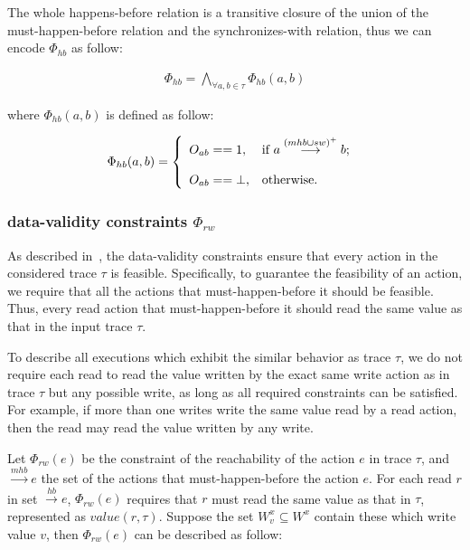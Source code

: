 \documentclass[preprint, numbers, 10pt]{sigplanconf}
\begin{document}
The whole happens-before relation is a transitive closure of the union of the must-happen-before relation
and the synchronizes-with relation, thus we can encode $\Phi_{hb}$ as follow: 

\begin{equation}
\begin{aligned}
\Phi_{hb} = \bigwedge_{\forall a,b\in \tau} \Phi_{hb}(a,b)
\end{aligned}
\end{equation}

where $\Phi_{hb}(a,b)$ is defined as follow: 

\[ \Phi_{hb}(a,b) = \left\{
  \begin{array}{l l}
    O_{ab}==1,           &  {\text{if $a \stackrel{(mhb\cup sw)^+}{\longrightarrow} b$; }}\\\\
    O_{ab}==\bot,  &  \text{otherwise}.
  \end{array} \right.\]

\subsubsection{data-validity constraints $\Phi_{rw}$}

As described in~\cite{Huang:2015}, the data-validity constraints
ensure that every action in the considered trace $\tau$ is feasible. 
Specifically, to guarantee the feasibility of an action, we require that
all the actions that must-happen-before it should be feasible. Thus,
every read action that must-happen-before it should read the same value
as that in the input trace $\tau$.  

To describe all executions which exhibit the similar behavior as trace $\tau$, 
we do not require each read to read the value written by the exact same write action
as in trace $\tau$ but any possible write, as long as all required constraints
can be satisfied. For example, if more than one writes write the same value read
by a read action, then the read may read the value written by any write.  

Let $\Phi_{rw}(e)$ be the constraint of the reachability of the action $e$ in trace $\tau$,
and  $\stackrel{mhb}{\longrightarrow} e$ the set of the actions that must-happen-before
the action $e$. For each read $r$ in set  $\stackrel{hb}{\longrightarrow} e$, $\Phi_{rw}(e)$
requires that $r$ must read the same value as that in $\tau$, represented as $value(r, \tau)$. 
Suppose %
the set $W_v^x\subseteq W^x$ contain these which write value $v$, then
$\Phi_{rw}(e)$ can be described as follow: 
\end{document}
